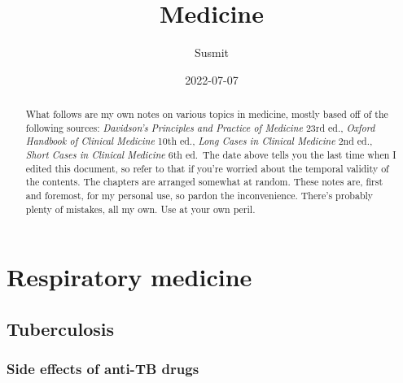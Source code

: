 \documentclass[
  12pt,
]{memoir}
\title{Medicine}
\author{Susmit}
\date{2022-07-07}
\begin{document}
\frontmatter
\maketitle
\begin{abstract}
What follows are my own notes on various topics in medicine, mostly
based off of the following sources: \emph{Davidson's Principles and
Practice of Medicine} 23rd ed., \emph{Oxford Handbook of Clinical
Medicine} 10th ed., \emph{Long Cases in Clinical Medicine} 2nd ed.,
\emph{Short Cases in Clinical Medicine} 6th ed.~The date above tells you
the last time when I edited this document, so refer to that if you're
worried about the temporal validity of the contents. The chapters are
arranged somewhat at random. These notes are, first and foremost, for my
personal use, so pardon the inconvenience. There's probably plenty of
mistakes, all my own. Use at your own peril.
\end{abstract}

\mainmatter
\openany
\raggedbottom
\twocoltocetc
\tableofcontents

\pagebreak

\hypertarget{respiratory-medicine}{%
\chapter{Respiratory medicine}\label{respiratory-medicine}}

\hypertarget{tuberculosis}{%
\section{Tuberculosis}\label{tuberculosis}}

\hypertarget{side-effects-of-anti-tb-drugs}{%
\subsection{Side effects of anti-TB
drugs}\label{side-effects-of-anti-tb-drugs}}
\end{document}
